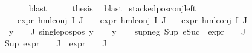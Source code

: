 \begin{isabellebody}
\ \ \ \ \isamarkupfalse%
\ blast\isanewline
\ \ \isamarkupfalse%
\ \isamarkupfalse%
\ {\isacharquery}{\kern0pt}thesis\ \isamarkupfalse%
\ blast\isanewline
{}\isamarkupfalse%
%
\endisatagproof
{\isafoldproof}%
%
\isadelimproof
\isanewline
%
\endisadelimproof
\isanewline
{}\isamarkupfalse%
\ stacked{\isacharunderscore}{\kern0pt}pos{\isacharunderscore}{\kern0pt}conj{\isacharunderscore}{\kern0pt}left{\isacharcolon}{\kern0pt}\isanewline
\ \ \ {\isachardoublequoteopen}expr{\isacharunderscore}{\kern0pt}{}\ {\isacharparenleft}{\kern0pt}hml{\isacharunderscore}{\kern0pt}conj\ I\ J\ {\isasymPhi}{\isacharparenright}{\kern0pt}\ {\isasymle}\ {}{\isachardoublequoteclose}\ {\isachardoublequoteopen}expr{\isacharunderscore}{\kern0pt}{}\ {\isacharparenleft}{\kern0pt}hml{\isacharunderscore}{\kern0pt}conj\ I\ J\ {\isasymPhi}{\isacharparenright}{\kern0pt}\ {\isasymle}\ {}{\isachardoublequoteclose}\isanewline
{\isachardoublequoteopen}expr{\isacharunderscore}{\kern0pt}{}\ {\isacharparenleft}{\kern0pt}hml{\isacharunderscore}{\kern0pt}conj\ I\ J\ {\isasymPhi}{\isacharparenright}{\kern0pt}\ {\isasymle}\ {}{\isachardoublequoteclose}\isanewline
{}\ {\isachardoublequoteopen}{\isacharparenleft}{\kern0pt}{\isasymforall}y\ {\isasymin}\ {\isacharparenleft}{\kern0pt}{\isasymPhi}\ {\isacharbackquote}{\kern0pt}\ J{\isacharparenright}{\kern0pt}{\isachardot}{\kern0pt}\ single{\isacharunderscore}{\kern0pt}pos{\isacharunderscore}{\kern0pt}pos\ y{\isacharparenright}{\kern0pt}{\isachardoublequoteclose}\isanewline
%
\isadelimproof
%
\endisadelimproof
%
\isatagproof
{}\isamarkupfalse%
\isanewline
\ \ \isamarkupfalse%
\ y\isanewline
\ \ \isamarkupfalse%
\ sup{\isacharunderscore}{\kern0pt}neg{\isacharcolon}{\kern0pt}\ {\isachardoublequoteopen}Sup\ {\isacharparenleft}{\kern0pt}{\isacharparenleft}{\kern0pt}eSuc\ {\isasymcirc}\ expr{\isacharunderscore}{\kern0pt}{}\ {\isasymcirc}\ {\isasymPhi}{\isacharparenright}{\kern0pt}\ {\isacharbackquote}{\kern0pt}\ J{\isacharparenright}{\kern0pt}\ {\isasymle}\ {}{\isachardoublequoteclose}\isanewline
{\isachardoublequoteopen}Sup\ {\isacharparenleft}{\kern0pt}{\isacharparenleft}{\kern0pt}expr{\isacharunderscore}{\kern0pt}{}\ {\isasymcirc}\ {\isasymPhi}{\isacharparenright}{\kern0pt}\ {\isacharbackquote}{\kern0pt}\ J\ {\isasymunion}\ {\isacharparenleft}{\kern0pt}expr{\isacharunderscore}{\kern0pt}{}\ {\isasymcirc}\ {\isasymPhi}{\isacharparenright}{\kern0pt}\ {\isacharbackquote}{\kern0pt}\ J{\isacharparenright}{\kern0pt}\ {\isasymle}\ {}{\isachardoublequoteclose}\isanewline

\end{isabellebody}
